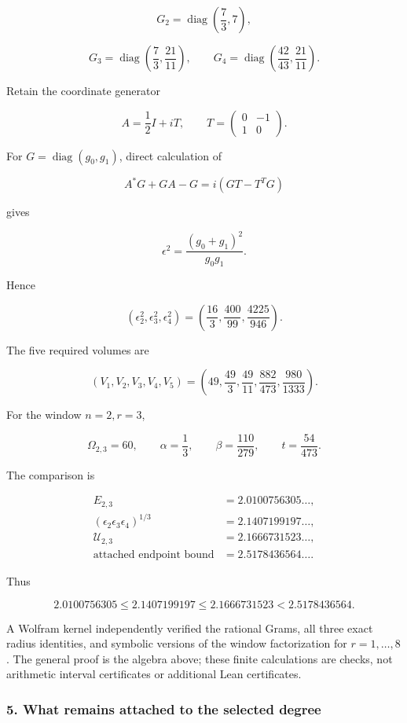 \[
G_2=\operatorname{diag}\left(\frac73,7\right),
\]

\[
G_3=\operatorname{diag}\left(\frac73,\frac{21}{11}\right),
\qquad
G_4=\operatorname{diag}\left(\frac{42}{43},\frac{21}{11}\right).
\]

Retain the coordinate generator

\[
A=\frac12I+iT,\qquad
T=\begin{pmatrix}0&-1\\1&0\end{pmatrix}.
\]

For \(G=\operatorname{diag}(g_0,g_1)\), direct calculation of

\[
A^*G+GA-G=i(GT-T^TG)
\]

gives

\[
\epsilon^2=\frac{(g_0+g_1)^2}{g_0g_1}.
\]

Hence

\[
(\epsilon_2^2,\epsilon_3^2,\epsilon_4^2)
=
\left(\frac{16}{3},\frac{400}{99},\frac{4225}{946}\right).
\]

The five required volumes are

\[
(V_1,V_2,V_3,V_4,V_5)
=
\left(
49,\frac{49}{3},\frac{49}{11},
\frac{882}{473},\frac{980}{1333}
\right).
\]

For the window \(n=2,r=3\),

\[
\Omega_{2,3}=60,\qquad
\alpha=\frac13,\qquad
\beta=\frac{110}{279},\qquad
t=\frac{54}{473}.
\]

The comparison is

\[
\begin{aligned}
E_{2,3}
&=2.0100756305\ldots,\\
\left(\epsilon_2\epsilon_3\epsilon_4\right)^{1/3}
&=2.1407199197\ldots,\\
\mathcal U_{2,3}
&=2.1666731523\ldots,\\
\text{attached endpoint bound}
&=2.5178436564\ldots.
\end{aligned}
\]

Thus

\[
\boxed{
2.0100756305
\le2.1407199197
\le2.1666731523
<2.5178436564.
}
\tag{18}
\]

A Wolfram kernel independently verified the rational Grams, all three exact radius identities, and symbolic versions of the window factorization for \(r=1,\ldots,8\). The general proof is the algebra above; these finite calculations are checks, not arithmetic interval certificates or additional Lean certificates.

\subsubsection{5. What remains attached to the selected degree}\label{endpoint-user_product_original--what-remains-attached-to-the-selected-degree}

